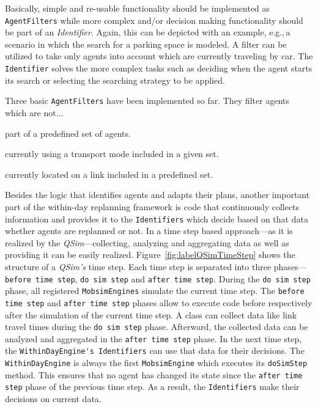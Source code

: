 
Basically, simple and re-usable functionality should be implemented as \lstinline{AgentFilters} while more complex and/or decision making functionality should be part of an \textit{Identifier}. Again, this can be depicted with an example, e.g.,\,a scenario in which the search for a parking space is modeled. A filter can be utilized to take only agents into account which are currently traveling by car. The \lstinline{Identifier} solves the more complex tasks such as deciding when the agent starts its search or selecting the searching strategy to be applied.


Three basic \lstinline{AgentFilters} have been implemented so far. They filter agents which are not...
\begin{compactitem}
    \item part of a predefined set of agents.
    \item currently using a transport mode included in a given set.
    \item currently located on a link included in a predefined set.
\end{compactitem}


Besides the logic that identifies agents and adapts their plans, another important part of the within-day replanning framework is code that continuously collects information and provides it to the \lstinline{Identifiers} which decide based on that data whether agents are replanned or not. In a time step based approach---as it is realized by the \emph{QSim}---collecting, analyzing and aggregating data as well as providing it can be easily realized. Figure~\ref{fig:labelQSimTimeStep} shows the structure of a \emph{QSim's} time step. Each time step is separated into three phases---\lstinline{before time step}, \lstinline{do sim step} and \lstinline{after time step}. During the \lstinline{do sim step} phase, all registered \lstinline{MobsimEngines} simulate the current time step. The \lstinline{before time step} and \lstinline{after time step} phases allow to execute code before respectively after the simulation of the current time step. A class can collect data like link travel times during the \lstinline{do sim step} phase. Afterward, the collected data can be analyzed and aggregated in the \lstinline{after time step} phase. In the next time step, the \lstinline{WithinDayEngine's Identifiers} can use that data for their decisions. The \lstinline{WithinDayEngine} is always the first \lstinline{MobsimEngine} which executes its \lstinline{doSimStep} method. This ensures that no agent has changed its state since the \lstinline{after time step} phase of the previous time step. As a result, the \lstinline{Identifiers} make their decisions on %
current data.


